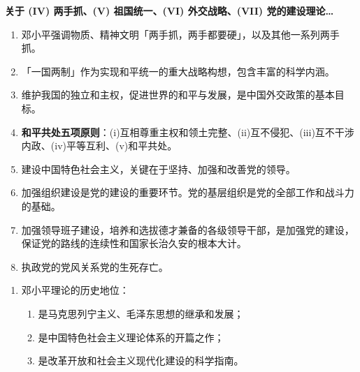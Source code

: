 \documentclass[UTF8]{ctexart}
\newcommand\Emph[2]{\colorbox{c#1-light}{\textcolor{c#1-emph}{\textbf{#2}}}}
\begin{document}
\begin{mybox}{6}
\textbf{关于 (IV) 两手抓、(V) 祖国统一、(VI) 外交战略、(VII) 党的建设理论…}
\begin{enumerate}[start=26]
  \item 邓小平强调物质、精神文明「两手抓，两手都要硬」，以及其他一系列两手抓。
  \item 「一国两制」作为实现和平统一的重大战略构想，包含丰富的科学内涵。
  \item 维护我国的独立和主权，促进世界的和平与发展，是中国外交政策的基本目标。
  \item \Emph{6}{和平共处五项原则}：(i)互相尊重主权和领土完整、(ii)互不侵犯、(iii)互不干涉内政、(iv)平等互利、(v)和平共处。
  \item 建设中国特色社会主义，关键在于坚持、加强和改善党的领导。
  \item 加强组织建设是党的建设的重要环节。党的基层组织是党的全部工作和战斗力的基础。
  \item 加强领导班子建设，培养和选拔德才兼备的各级领导干部，是加强党的建设，保证党的路线的连续性和国家长治久安的根本大计。
  \item 执政党的党风关系党的生死存亡。
\end{enumerate}
\end{mybox}

\begin{enumerate}[start=34]
  \item 邓小平理论的历史地位：
  \begin{enumerate}[label={\roman{enumii})}, start=1]
    \item 是马克思列宁主义、毛泽东思想的继承和发展；
    \item 是中国特色社会主义理论体系的开篇之作；
    \item 是改革开放和社会主义现代化建设的科学指南。
  \end{enumerate}
\end{enumerate}

\newpage
{}
\BgThispage
\pagecolor{c7-med}
\end{document}
